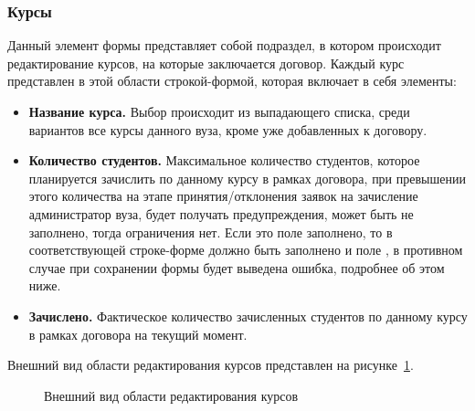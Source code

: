 \subsubsection{Курсы} Данный элемент формы представляет собой подраздел, в котором происходит редактирование курсов, на которые заключается договор. Каждый курс представлен в этой области строкой-формой, которая включает в себя элементы:
		\begin{itemize}
			\item \textbf{Название курса.} Выбор происходит из выпадающего списка, среди вариантов все курсы данного вуза, кроме уже добавленных к договору.
			\item \textbf{Количество студентов.} Максимальное количество студентов, которое планируется зачислить по данному курсу в рамках договора, при превышении этого количества на этапе принятия/отклонения заявок на зачисление администратор вуза, будет получать предупреждения, может быть не заполнено, тогда ограничения нет. Если это поле заполнено, то в соответствующей строке-форме должно быть заполнено и поле , в противном случае при сохранении формы будет выведена ошибка, подробнее об этом ниже.
			\item \textbf{Зачислено.} Фактическое количество зачисленных студентов по данному курсу в рамках договора на текущий момент.
		\end{itemize}
		Внешний вид области редактирования курсов представлен на рисунке~\ref{agreement:edit_course}.
		\begin{figure}[H]
			\caption{Внешний вид области редактирования курсов}
			\label{agreement:edit_course}
		\end{figure}	


